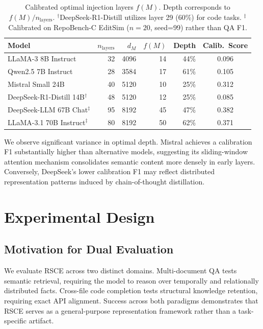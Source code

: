 \documentclass[11pt]{article}
\begin{document}
\begin{table}[h]
\centering
\caption{Calibrated optimal injection layers $f(M)$. Depth corresponds to $f(M) / n_\text{layers}$. $^\dagger$DeepSeek-R1-Distill utilizes layer 29 (60\%) for code tasks. $^\ddagger$Calibrated on RepoBench-C EditSim ($n=20$, seed=99) rather than QA F1.}
\label{tab:calibration}
\begin{tabular}{lrrrrc}
\toprule
Model & $n_\text{layers}$ & $d_M$ & $f(M)$ & Depth & Calib.\ Score \\
\midrule
LLaMA-3 8B Instruct     & 32 & 4096 & 14 & 44\% & 0.096 \\
Qwen2.5 7B Instruct     & 28 & 3584 & 17 & 61\% & 0.105 \\
Mistral Small 24B       & 40 & 5120 & 10 & 25\% & 0.312 \\
DeepSeek-R1-Distill 14B$^\dagger$ & 48 & 5120 & 12 & 25\% & 0.085 \\
DeepSeek-LLM 67B Chat$^\ddagger$ & 95 & 8192 & 45 & 47\% & 0.382 \\
LLaMA-3.1 70B Instruct$^\ddagger$ & 80 & 8192 & 50 & 62\% & 0.371 \\
\bottomrule
\end{tabular}
\end{table}

We observe significant variance in optimal depth. Mistral achieves a calibration F1 substantially higher than alternative models, suggesting its sliding-window attention mechanism consolidates semantic content more densely in early layers. Conversely, DeepSeek's lower calibration F1 may reflect distributed representation patterns induced by chain-of-thought distillation.

\section{Experimental Design}
\label{sec:design}

\subsection{Motivation for Dual Evaluation}
We evaluate RSCE across two distinct domains. Multi-document QA tests semantic retrieval, requiring the model to reason over temporally and relationally distributed facts. Cross-file code completion tests structural knowledge retention, requiring exact API alignment. Success across both paradigms demonstrates that RSCE serves as a general-purpose representation framework rather than a task-specific artifact.
\end{document}

